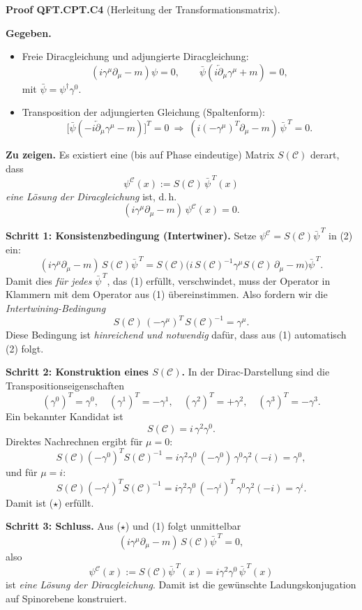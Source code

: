 \documentclass[10pt, letterpaper]{article}
\newcommand{\CustomHeading}[3]{%
  \par\medskip\noindent%
  \textbf{#1 #2} \textnormal{(#3)}.\enskip%
}
\newenvironment{PROOF}[2]{\begin{unitbox}\CustomHeading{Proof}{#1}{#2}}{\end{unitbox}}
\begin{document}
\begin{PROOF}{QFT.CPT.C4}{Herleitung der Transformationsmatrix}
\textbf{Gegeben.}
\begin{itemize}
  \item Freie Diracgleichung und adjungierte Diracgleichung:
  \[
    (i\gamma^\mu\partial_\mu - m)\psi=0,
    \qquad
    \bar\psi(i\overleftarrow{\partial}_\mu\gamma^\mu + m)=0,
  \]
  mit $\bar\psi=\psi^\dagger\gamma^0$.
  \item Transposition der adjungierten Gleichung (Spaltenform):
  \[
    \big[\bar\psi(-i\overleftarrow{\partial}_\mu\gamma^\mu - m)\big]^T=0
    \ \Longrightarrow\
    \boxed{(i(-\gamma^\mu)^T\partial_\mu - m)\,\bar\psi^{\,T}=0.}
    \tag{1}
  \]
\end{itemize}

\textbf{Zu zeigen.}
Es existiert eine (bis auf Phase eindeutige) Matrix $S(\mathcal C)$ derart, dass
\[
\boxed{\ \psi^{\mathcal C}(x):=S(\mathcal C)\,\bar\psi^{\,T}(x)\ }
\]
\emph{eine Lösung der Diracgleichung} ist, d.\,h.
\[
\boxed{\ (i\gamma^\mu\partial_\mu - m)\,\psi^{\mathcal C}(x)=0. \ }
\tag{2}
\]

\textbf{Schritt 1: Konsistenzbedingung (Intertwiner).}
Setze $\psi^{\mathcal C}=S(\mathcal C)\bar\psi^{\,T}$ in (2) ein:
\[
(i\gamma^\mu\partial_\mu - m)\,S(\mathcal C)\bar\psi^{\,T}
= S(\mathcal C)\big(i\,S(\mathcal C)^{-1}\gamma^\mu S(\mathcal C)\,\partial_\mu - m\big)\bar\psi^{\,T}.
\]
Damit dies \emph{für jedes} $\bar\psi^{\,T}$, das (1) erfüllt, verschwindet, muss der Operator in Klammern mit dem Operator aus (1) übereinstimmen. Also fordern wir die \emph{Intertwining-Bedingung}
\[
\boxed{\ S(\mathcal C)\,(-\gamma^\mu)^T\,S(\mathcal C)^{-1}=\gamma^\mu. \ }
\tag{$\star$}
\]
Diese Bedingung ist \emph{hinreichend und notwendig} dafür, dass aus (1) automatisch (2) folgt.

\textbf{Schritt 2: Konstruktion eines $S(\mathcal C)$.}
In der Dirac-Darstellung sind die Transpositionseigenschaften
\[
(\gamma^0)^T=\gamma^0,\quad
(\gamma^1)^T=-\gamma^1,\quad
(\gamma^2)^T=+\gamma^2,\quad
(\gamma^3)^T=-\gamma^3.
\]
Ein bekannter Kandidat ist
\[
\boxed{\ S(\mathcal C)=i\,\gamma^2\gamma^0. \ }
\]
Direktes Nachrechnen ergibt für $\mu=0$:
\[
S(\mathcal C)(-\gamma^0)^T S(\mathcal C)^{-1}
= i\gamma^2\gamma^0\,(-\gamma^0)\,\gamma^0\gamma^2(-i)=\gamma^0,
\]
und für $\mu=i$:
\[
S(\mathcal C)(-\gamma^i)^T S(\mathcal C)^{-1}
= i\gamma^2\gamma^0\,(-\gamma^i)^T\,\gamma^0\gamma^2(-i)=\gamma^i.
\]
Damit ist ($\star$) erfüllt.

\textbf{Schritt 3: Schluss.}
Aus ($\star$) und (1) folgt unmittelbar
\[
(i\gamma^\mu\partial_\mu - m)\,S(\mathcal C)\bar\psi^{\,T}=0,
\]
also
\[
\boxed{\
\psi^{\mathcal C}(x):=S(\mathcal C)\bar\psi^{\,T}(x)
= i\gamma^2\gamma^0\,\bar\psi^{\,T}(x)
\ }
\]
ist \emph{eine Lösung der Diracgleichung}. Damit ist die gewünschte Ladungskonjugation auf Spinorebene konstruiert.


\end{PROOF}
\end{document}
